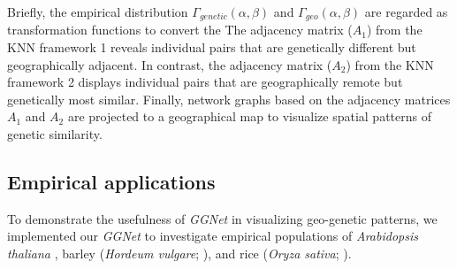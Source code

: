 \documentclass[11pt]{article}
\begin{document}
Briefly, the empirical distribution $\Gamma_{genetic}(\alpha,\beta)$ and $\Gamma_{geo}(\alpha,\beta)$ are regarded as transformation functions to convert the 
The adjacency matrix ($A_1$) from the KNN framework 1 reveals individual pairs that are genetically different but geographically adjacent.
In contrast, the adjacency matrix ($A_2$) from the KNN framework 2 displays individual pairs that are geographically remote but genetically most similar.
Finally, network graphs based on the adjacency matrices $A_{1}$ and $A_{2}$ are projected to a geographical map to visualize spatial patterns of genetic similarity.


\subsection*{Empirical applications}


To demonstrate the usefulness of \textit{GGNet} in visualizing geo-genetic patterns, we implemented our \textit{GGNet} to investigate empirical populations of \textit{Arabidopsis thaliana} \citep{alonso20161, weigel20091001}, barley (\textit{Hordeum vulgare}; \citealt{milner2019genebank}), and rice (\textit{Oryza sativa}; \citep{rice3kproj,wang2018genomic}).
\end{document}
